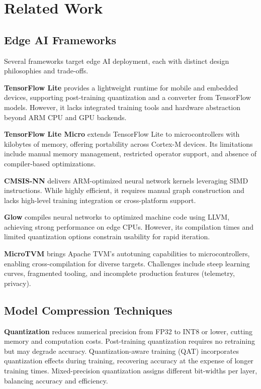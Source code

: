 \section{Related Work}

\subsection{Edge AI Frameworks}

Several frameworks target edge AI deployment, each with distinct design philosophies and trade-offs.

\textbf{TensorFlow Lite} \cite{tflite} provides a lightweight runtime for mobile and embedded devices, supporting post-training quantization and a converter from TensorFlow models. However, it lacks integrated training tools and hardware abstraction beyond ARM CPU and GPU backends.

\textbf{TensorFlow Lite Micro} \cite{tflitemicro} extends TensorFlow Lite to microcontrollers with kilobytes of memory, offering portability across Cortex-M devices. Its limitations include manual memory management, restricted operator support, and absence of compiler-based optimizations.

\textbf{CMSIS-NN} \cite{cmsis-nn} delivers ARM-optimized neural network kernels leveraging SIMD instructions. While highly efficient, it requires manual graph construction and lacks high-level training integration or cross-platform support.

\textbf{Glow} \cite{glow} compiles neural networks to optimized machine code using LLVM, achieving strong performance on edge CPUs. However, its compilation times and limited quantization options constrain usability for rapid iteration.

\textbf{MicroTVM} \cite{microtvm} brings Apache TVM's autotuning capabilities to microcontrollers, enabling cross-compilation for diverse targets. Challenges include steep learning curves, fragmented tooling, and incomplete production features (telemetry, privacy).

\subsection{Model Compression Techniques}

\textbf{Quantization} reduces numerical precision from FP32 to INT8 or lower, cutting memory and computation costs. Post-training quantization \cite{ptq} requires no retraining but may degrade accuracy. Quantization-aware training (QAT) \cite{qat} incorporates quantization effects during training, recovering accuracy at the expense of longer training times. Mixed-precision quantization \cite{mixed-precision} assigns different bit-widths per layer, balancing accuracy and efficiency.

